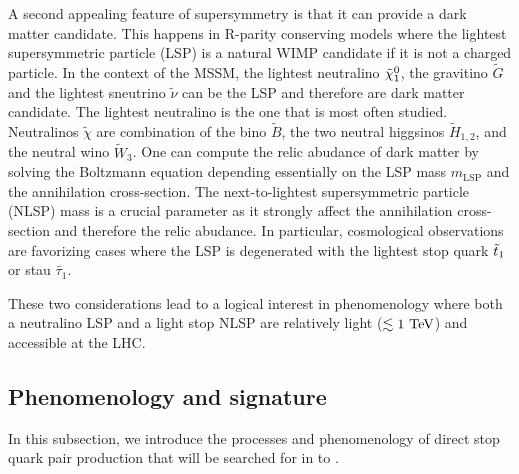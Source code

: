 

        A second appealing feature of supersymmetry is that it can provide a dark matter
        candidate. This happens in R-parity conserving models where the lightest supersymmetric
        particle (LSP) is a natural WIMP candidate if it is not a charged particle. In the
        context of the MSSM, the lightest neutralino $\tilde{\chi}_1^0$, the gravitino $\tilde{G}$
        and the lightest sneutrino $\tilde{\nu}$ can be the LSP and therefore are dark matter
        candidate. The lightest neutralino is the one that is most often studied. Neutralinos
        $\tilde{\chi}$ are combination of the bino $\tilde{B}$, the two neutral higgsinos
        $\tilde{H}_{1,2}$, and the neutral wino $\tilde{W}_3$. One can compute the relic
        abudance of dark matter by solving the Boltzmann equation \cite{EllisDarkMatter}
        depending essentially on the LSP mass $m_{\text{LSP}}$ and the annihilation cross-section.
        The next-to-lightest supersymmetric particle (NLSP) mass is a crucial parameter as
        it strongly affect the annihilation cross-section and therefore the relic abudance.
        In particular, cosmological observations are favorizing cases where the LSP is
        degenerated with the lightest stop quark $\tilde{t}_1$ or stau $\tilde{\tau_1}$.

        These two considerations lead to a logical interest in phenomenology where both a
        neutralino LSP and a light stop NLSP are relatively light ($\lesssim 1~\text{TeV}$) and
        accessible at the LHC.

        \subsection{Phenomenology and signature}

        In this subsection, we introduce the processes and phenomenology of direct stop
        quark pair production that will be searched for in
         to .


